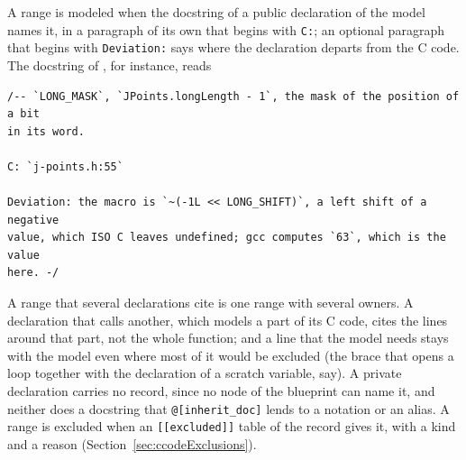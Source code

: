 A range is modeled when the docstring of a public declaration of the model names it, in a paragraph
of its own that begins with \verb|C:|; an optional paragraph that begins with \verb|Deviation:| says
where the declaration departs from the C code. The docstring of , for
instance, reads
\begingroup\small
\begin{verbatim}
/-- `LONG_MASK`, `JPoints.longLength - 1`, the mask of the position of a bit
in its word.

C: `j-points.h:55`

Deviation: the macro is `~(-1L << LONG_SHIFT)`, a left shift of a negative
value, which ISO C leaves undefined; gcc computes `63`, which is the value
here. -/
\end{verbatim}
\endgroup
A range that several declarations cite is one range with several owners. A declaration that calls
another, which models a part of its C code, cites the lines around that part, not the whole
function; and a line that the model needs stays with the model even where most of it would be
excluded (the brace that opens a loop together with the declaration of a scratch variable, say). A
private declaration carries no record, since no node of the blueprint can name it, and neither does
a docstring that \verb|@[inherit_doc]| lends to a notation or an alias. A range is excluded when an
\verb|[[excluded]]| table of the record gives it, with a kind and a reason
(Section~\ref{sec:ccodeExclusions}).

